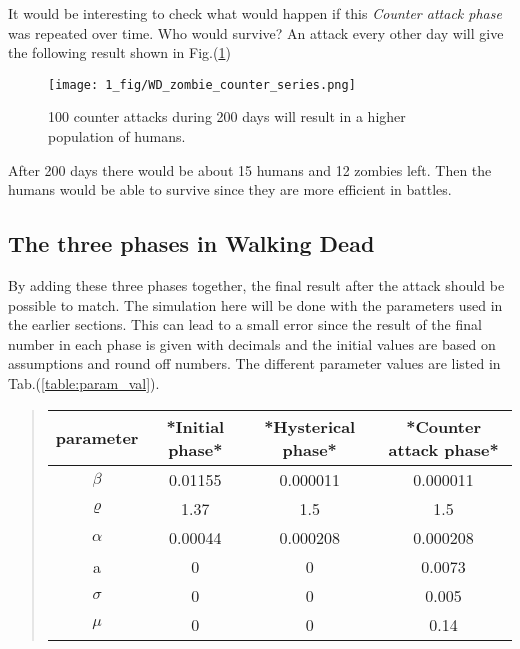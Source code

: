 \documentclass[%
twoside,                 %
final,                   %
chapterprefix=true,      %
open=right               %
10pt]{book}
\begin{document}
It would be interesting to check what would happen if this \emph{Counter attack phase} was repeated over time. Who would survive? An attack every other day will give the following result shown in Fig.(\ref{fig:counter_series})


\begin{figure}[ht]
  \centerline{\texttt{[image: 1\_fig/WD\_zombie\_counter\_series.png]}}
  \caption{
  \label{fig:counter_series} 100 counter attacks during 200 days will result in a higher population of humans.
  }
\end{figure}


After 200 days there would be about 15 humans and 12 zombies left. Then the humans would be able to survive since they are more efficient in battles. 

\subsection{The three phases in Walking Dead}
By adding these three phases together, the final result after the attack should be possible to match. The simulation here will be done with the parameters used in the earlier sections. This can lead to a small error since the result of the final number in each phase is given with decimals and the initial values are based on assumptions and round off numbers. The different parameter values are listed in Tab.(\ref{table:param_val}). 

\label{table:param_val}

\begin{quote}
\begin{tabular}{cccc}
\hline
\multicolumn{1}{c}{ parameter } & \multicolumn{1}{c}{ *Initial phase* } & \multicolumn{1}{c}{ *Hysterical phase* } & \multicolumn{1}{c}{ *Counter attack phase* } \\
\hline
$\beta$   & 0.01155         & 0.000011           & 0.000011               \\
$\varrho$ & 1.37            & 1.5                & 1.5                    \\
$\alpha$  & 0.00044         & 0.000208           & 0.000208               \\
a         & 0               & 0                  & 0.0073                 \\
$\sigma$  & 0               & 0                  & 0.005                  \\
$\mu$     & 0               & 0                  & 0.14                   \\
\hline
\end{tabular}
\end{quote}
\end{document}

